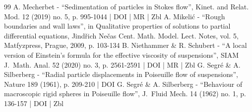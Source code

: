 \documentclass[10pt]{amsart}
\theoremstyle{plain}
\theoremstyle{definition}
\begin{document}
\begin{thebibliography}{99}
A. Mecherbet - “Sedimentation of particles in Stokes flow”, Kinet. and Relat. Mod. 12 (2019) no. 5, p. 995-1044 | DOI | MR | Zbl
A. Mikelić - “Rough boundaries and wall laws”, in Qualitative properties of solutions to partial differential equations, Jindřich Nečas Cent. Math. Model. Lect. Notes, vol. 5, Matfyzpress, Prague, 2009, p. 103-134
B. Niethammer \& R. Schubert - “A local version of Einstein’s formula for the effective viscosity of suspensions”, SIAM J. Math. Anal. 52 (2020) no. 3, p. 2561-2591 | DOI | MR | Zbl
G. Segré \& A. Silberberg - “Radial particle displacements in Poiseuille flow of suspensions”, Nature 189 (1961), p. 209-210 | DOI
G. Segré \& A. Silberberg - “Behaviour of macroscopic rigid spheres in Poiseuille flow”, J. Fluid Mech. 14 (1962) no. 1, p. 136-157 | DOI | Zbl
\end{thebibliography}
\end{document}
